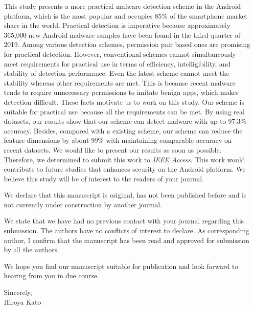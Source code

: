 \documentclass[12pt, a4paper]{article}
\begin{document}
\vspace{\baselineskip}
\noindent
This study presents a more practical malware detection scheme in the Android platform, which is the most popular and occupies 85\% of the smartphone market share in the world.
Practical detection is imperative because approximately 365,000 new Android malware samples have been found in the third quarter of 2019.
Among various detection schemes, permission pair based ones are promising for practical detection.
However, conventional schemes cannot simultaneously meet requirements for practical use in terms of efficiency, intelligibility, and stability of detection performance. 
Even the latest scheme cannot meet the stability whereas other requirements are met.
This is because recent malware tends to require unnecessary permissions to imitate benign apps, which makes detection difficult.
These facts motivate us to work on this study.
Our scheme is suitable for practical use because all the requirements can be met.
By using real datasets, our results show that our scheme can detect malware with up to 97.3\% accuracy. Besides, compared with a existing scheme, our scheme can reduce the feature dimensions by about 99\% with maintaining comparable accuracy on recent datasets.
We would like to present our results as soon as possible.
Therefore, we determined to submit this work to \textit{IEEE Access}.
This work would contribute to future studies that enhances security on the Android platform.
We believe this study will be of interest to the readers of your journal.

\vspace{\baselineskip}
\noindent
We declare that this manuscript is original, has not been published before and is not currently under construction by another journal.

\vspace{\baselineskip}
\noindent
We state that we have had no previous contact with your journal regarding this submission.
The authors have no conflicts of interest to declare.
As corresponding author, I confirm that the manuscript has been read and approved for submission by all the authors.  

\vspace{\baselineskip}
\noindent
We hope you find our manuscript suitable for publication and look forward to hearing from you in due course.

\begin{flushleft}
Sincerely, \\
Hiroya Kato\\
\end{flushleft}
\end{document}
